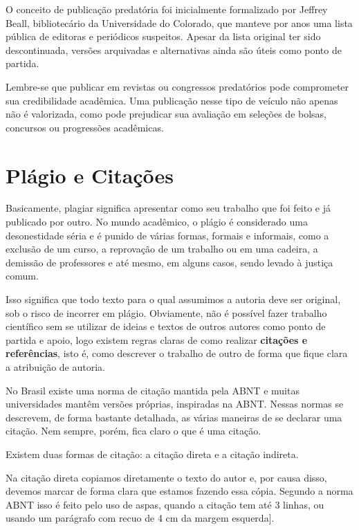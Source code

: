 O conceito de publicação predatória foi inicialmente formalizado por Jeffrey Beall, bibliotecário da Universidade do Colorado, que manteve por anos uma lista pública de editoras e periódicos suspeitos. Apesar da lista original ter sido descontinuada, versões arquivadas e alternativas ainda são úteis como ponto de partida.

Lembre-se que publicar em revistas ou congressos predatórios pode comprometer sua credibilidade acadêmica. 
Uma publicação nesse tipo de veículo não apenas não é valorizada, como pode prejudicar sua avaliação em seleções de bolsas, concursos ou progressões acadêmicas.


 \section{Plágio e Citações}

Basicamente, plagiar significa apresentar como seu trabalho que foi feito e já publicado por outro. 
No mundo acadêmico, o plágio é considerado uma desonestidade séria e é punido de várias formas, formais e informais, como a exclusão de um curso, a reprovação de um trabalho ou em uma cadeira, a demissão de professores e até mesmo, em alguns casos, sendo levado à justiça comum.

Isso significa que todo texto para o qual assumimos a autoria deve ser original, sob o risco de incorrer em plágio. 
Obviamente, não é possível fazer trabalho científico sem se utilizar de ideias e textos de outros autores como ponto de partida e apoio, logo existem regras claras de como realizar \textbf{citações e referências}, isto é, como descrever o trabalho de outro de forma que fique clara a atribuição de autoria.

No Brasil existe uma norma de citação mantida pela ABNT e muitas universidades mantêm versões próprias, inspiradas na ABNT. Nessas normas se descrevem, de forma bastante detalhada, as várias maneiras de se declarar uma citação. Nem sempre, porém, fica claro o que é uma citação.

Existem duas formas de citação: a citação direta e a citação indireta. 

Na citação direta copiamos diretamente o texto do autor e, por causa disso, devemos marcar de forma clara que estamos fazendo essa cópia. Segundo a norma ABNT isso é feito pelo uso de aspas, quando a citação tem até 3 linhas, ou usando um parágrafo com recuo de 4 cm da margem esquerda]\citep{abnt10520_2023}.

